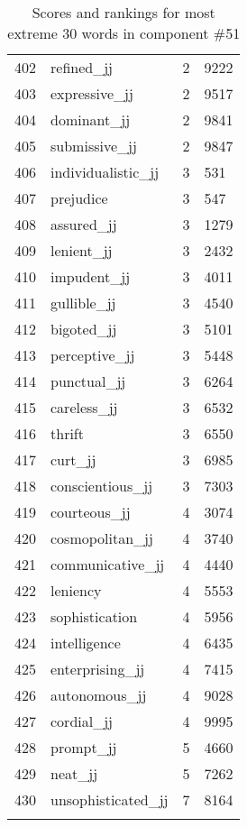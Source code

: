 \begin{longtable}[!htbp]{| rlr@{.}l |}
    402 & refined\_jj & 2 & 9222 \\
    403 & expressive\_jj & 2 & 9517 \\
    404 & dominant\_jj & 2 & 9841 \\
    405 & submissive\_jj & 2 & 9847 \\
    406 & individualistic\_jj & 3 & 531 \\
    407 & prejudice & 3 & 547 \\
    408 & assured\_jj & 3 & 1279 \\
    409 & lenient\_jj & 3 & 2432 \\
    410 & impudent\_jj & 3 & 4011 \\
    411 & gullible\_jj & 3 & 4540 \\
    412 & bigoted\_jj & 3 & 5101 \\
    413 & perceptive\_jj & 3 & 5448 \\
    414 & punctual\_jj & 3 & 6264 \\
    415 & careless\_jj & 3 & 6532 \\
    416 & thrift & 3 & 6550 \\
    417 & curt\_jj & 3 & 6985 \\
    418 & conscientious\_jj & 3 & 7303 \\
    419 & courteous\_jj & 4 & 3074 \\
    420 & cosmopolitan\_jj & 4 & 3740 \\
    421 & communicative\_jj & 4 & 4440 \\
    422 & leniency & 4 & 5553 \\
    423 & sophistication & 4 & 5956 \\
    424 & intelligence & 4 & 6435 \\
    425 & enterprising\_jj & 4 & 7415 \\
    426 & autonomous\_jj & 4 & 9028 \\
    427 & cordial\_jj & 4 & 9995 \\
    428 & prompt\_jj & 5 & 4660 \\
    429 & neat\_jj & 5 & 7262 \\
    430 & unsophisticated\_jj & 7 & 8164 \\
    \hline
    \caption{Scores and rankings for most extreme 30 words in component \#51} \\
\end{longtable}
